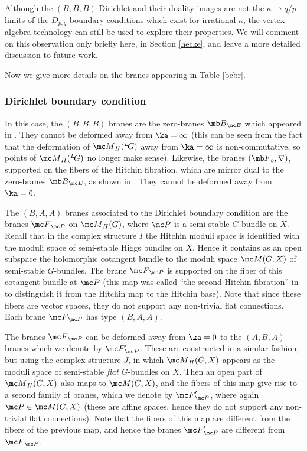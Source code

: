 \documentclass[11pt,reqno]{amsart}
\theoremstyle{plain}
\numberwithin{equation}{section}
\def\neg{\negthinspace}
\def\LG{{}^L\neg G}
\theoremstyle{definition}
\begin{document}
Although the $(B,B,B)$ Dirichlet and their duality images are not the
$\kappa \to q/p$ limits of the $D_{p,q}$ boundary conditions which
exist for irrational $\kappa$, the vertex algebra technology can still
be used to explore their properties. We will comment on this
observation only briefly here, in Section \ref{hecke}, and leave a
more detailed discussion to future work.

Now we give more details on the branes appearing in Table \ref{bcbr}.

\subsubsection{Dirichlet boundary condition} In this case, the
$(B,B,B)$ branes are the zero-branes ${\mb B}_{\mc E}$ which appeared
in \cite{KW}. They cannot be deformed away from $\ka=\infty$ (this can
be seen from the fact that the deformation of ${\mc M}_H(\LG)$ away
from $\ka=\infty$ is non-commutative, so points of ${\mc M}_H(\LG)$ no
longer make sense). Likewise, the branes $({\mb F}_b,\nabla)$,
supported on the fibers of the Hitchin fibration, which are mirror
dual to the zero-branes ${\mb B}_{\mc E}$, as shown in \cite{KW}. They
cannot be deformed away from $\ka=0$.

The $(B,A,A)$ branes associated to the Dirichlet boundary condition
are the branes ${\mc F}_{\mc P}$ on ${\mc M}_H(G)$, where ${\mc P}$ is
a semi-stable $G$-bundle on $X$. Recall that in the complex structure
$I$ the Hitchin moduli space is identified with the moduli space of
semi-stable Higgs bundles on $X$. Hence it contains as an open
subspace the holomorphic cotangent bundle to the moduli space ${\mc
  M}(G,X)$ of semi-stable $G$-bundles. The brane ${\mc F}_{\mc P}$ is
supported on the fiber of this cotangent bundle at ${\mc P}$ (this map
was called ``the second Hitchin fibration'' in \cite{KW} to
distinguish it from the Hitchin map to the Hitchin base). Note that
since these fibers are vector spaces, they do not support any
non-trivial flat connections. Each brane ${\mc F}_{\mc P}$ has type
$(B,A,A)$.

The branes ${\mc F}_{\mc P}$ can be deformed away from $\ka=0$ to the
$(A,B,A)$ branes which we denote by ${\mc F}'_{\mc P}$. These are
constructed in a similar fashion, but using the complex structure $J$,
in which ${\mc M}_H(G,X)$ appears as the moduli space of semi-stable
{\em flat} $G$-bundles on $X$. Then an open part of ${\mc M}_H(G,X)$
also maps to ${\mc M}(G,X)$, and the fibers of this map give rise to a
second family of branes, which we denote by ${\mc F}'_{\mc P}$, where
again ${\mc P} \in {\mc M}(G,X)$ (these are affine spaces, hence they
do not support any non-trivial flat connections). Note that the fibers
of this map are different from the fibers of the previous map, and
hence the branes ${\mc F}'_{\mc P}$ are different from ${\mc F}_{\mc
  P}$.
\end{document}
